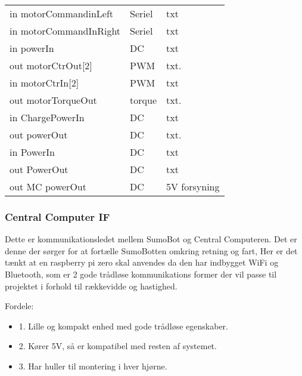 \begin{table*}[]
\begin{tabular}{lp{5cm}p{7cm}}
        in motorCommandinLeft      & Seriel                        & txt                                                                                              \\
        in motorCommandInRight   & Seriel                          & txt 
                 \\
        in powerIn               & DC                              & txt 
                 \\
        out motorCtrOut[2]      & PWM                             & txt.&                                                                                          \\
        in motorCtrIn[2]         & PWM                               & txt 
                \\
        out motorTorqueOut    & torque                               & txt.& 
                \\
        in ChargePowerIn       & DC                               & txt 
                \\
        out powerOut           & DC                              & txt.& 
                 \\
        in PowerIn             & DC                               & txt 
                \\
        out PowerOut             & DC                               & txt 
                \\
        out MC powerOut        & DC                               & 5V forsyning 
                \\
                \bottomrule
    \end{tabular}%
\end{table*}


\subsubsection*{\textbf{Central Computer IF}}
Dette er kommunikationsledet mellem SumoBot og Central Computeren. Det er denne der sørger for at fortælle SumoBotten omkring retning og fart, 
Her er det tænkt at en raspberry pi zero skal anvendes da den har indbygget WiFi og Bluetooth, som er 2 gode trådløse kommunikations former der vil passe til projektet i forhold til rækkevidde og hastighed. 

Fordele: 
\begin{itemize}
\item 1. Lille og kompakt enhed med gode trådløse egenskaber.
\item 2. Kører 5V, så er kompatibel med resten af systemet.
\item 3. Har huller til montering i hver hjørne.
\end{itemize}


